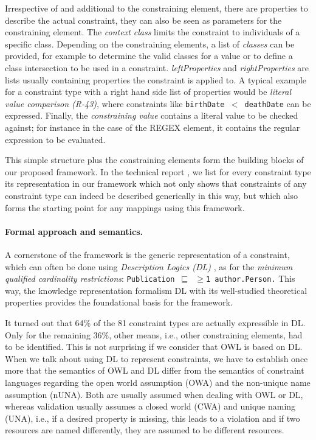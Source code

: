 \documentclass[a4paper,fontsize=11pt]{scrartcl}
\newcommand{\ms}[1]{\texttt{#1}}
\begin{document}
Irrespective of and additional to the constraining element, there are properties to describe the actual constraint, they can also be seen as parameters for the constraining element. The \emph{context class} limits the constraint to individuals of a specific class. Depending on the constraining elements, a list of \emph{classes} can be provided, for example to determine the valid classes for a value or to define a class intersection to be used in a constraint. \emph{leftProperties} and \emph{rightProperties} are lists usually containing properties the constraint is applied to. A typical example for a constraint type with a right hand side list of properties would be \emph{literal value comparison (R-43)}, where constraints like {\small\ms{birthDate $<$ deathDate}} can be expressed. Finally, the \emph{constraining value} contains a literal value to be checked against; for instance in the case of the REGEX element, it contains the regular expression to be evaluated.

This simple structure plus the constraining elements form the building blocks of our proposed framework. In the technical report \cite{BoschNolleAcarEckert2015}, we list for every constraint type its representation in our framework which not only shows that constraints of any constraint type can indeed be described generically in this way, but which also forms the starting point for any mappings using this framework.

\paragraph{Formal approach and semantics.}

A cornerstone of the framework is the generic representation of a constraint, which can often be done using \emph{Description Logics (DL)} \cite{Kroetzsch2012,Baader-2003,Baader-Nutt-2003}, as for the \emph{minimum qualified cardinality restrictions}: {\small\ms{Publication $\sqsubseteq$ $\geq$1 author.Person.}}  This way, the knowledge representation formalism DL with its well-studied theoretical properties provides the foundational basis for the framework.

It turned out that 64\% of the 81 constraint types are actually expressible in DL. Only for the remaining 36\%, other means, i.e., other constraining elements, had to be identified. This is not surprising if we consider that OWL is based on DL. When we talk about using DL to represent constraints, we have to establish once more that the semantics of OWL and DL differ from the semantics of constraint languages regarding the open world assumption (OWA) and the non-unique name assumption (nUNA). Both are usually assumed when dealing with OWL or DL, whereas validation usually assumes a closed world (CWA) and unique naming (UNA), i.e., if a desired property is missing, this leads to a violation and if two resources are named differently, they are assumed to be different resources. 
\end{document}
